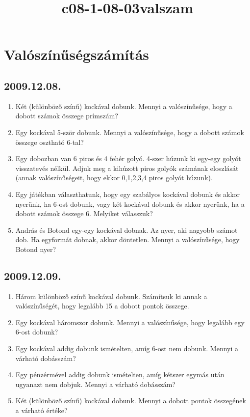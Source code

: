\documentclass{article}
\title{c08-1-08-03valszam}
\begin{document}
\section*{Valószínűségszámítás}

\subsection*{2009.12.08.}
\begin{enumerate}
\item Két (különböző színű) kockával dobunk. Mennyi a valószínűsége, hogy a dobott számok összege prímszám?
\item Egy kockával 5-ször dobunk. Mennyi a valószínűsége, hogy a dobott számok összege osztható 6-tal? 
\item Egy dobozban van 6 piros és 4 fehér golyó. 4-szer húzunk ki egy-egy golyót visszatevés nélkül. Adjuk meg a kihúzott piros golyók számának eloszlását (annak valószínűségeit, hogy ekkor 0,1,2,3,4 piros golyót húzunk).
\item Egy játékban választhatunk, hogy egy szabályos kockával dobunk és akkor nyerünk, ha 6-ost dobunk, vagy két kockával dobunk és akkor nyerünk, ha a dobott számok összege 6. Melyiket válasszuk?
\item András és Botond egy-egy kockával dobnak. Az nyer, aki nagyobb számot dob. Ha egyformát dobnak, akkor döntetlen. Mennyi a valószínűsége, hogy Botond nyer?
\end{enumerate}

\subsection*{2009.12.09.}
\begin{enumerate}
\item Három különböző színű kockával dobunk. Számítsuk ki annak a valószínűségét, hogy legalább 15 a dobott pontok összege.
\item Egy kockával háromszor dobunk. Mennyi a valószínűsége, hogy legalább egy 6-ost dobunk?
\item Egy kockával addig dobunk ismételten, amíg 6-ost nem dobunk. Mennyi a várható dobásszám?
\item Egy pénzérmével addig dobunk ismételten, amíg kétszer egymás után ugyanazt nem dobjuk. Mennyi a várható dobásszám?
\item Két (különböző színű) kockával dobunk. Mennyi a dobott pontok összegének a várható értéke?
\end{enumerate}
\end{document}

